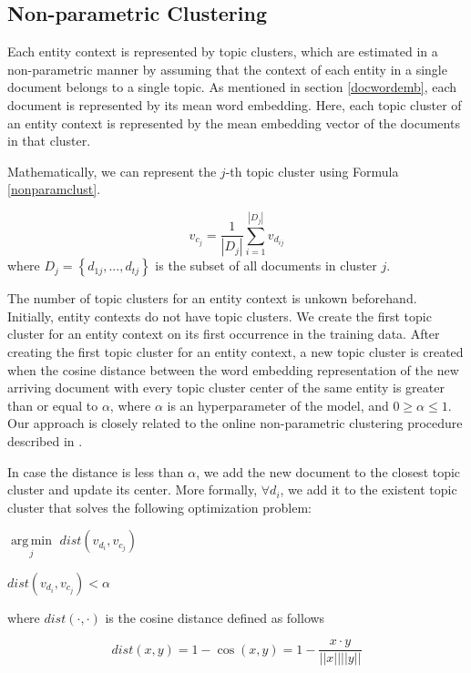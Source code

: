 \documentclass{article}
\DeclareMathOperator*{\argmin}{arg\,min}
\begin{document}
\subsection{Non-parametric Clustering}

Each entity context is represented by topic clusters, which are estimated in a non-parametric manner by assuming that the context of each entity in a single document belongs to a single topic. As mentioned in section \ref{docwordemb}, each document is represented by its mean word embedding. Here, each topic cluster of an entity context is represented by the mean embedding vector of the documents in that cluster.

Mathematically, we can represent the $j$-th topic cluster using Formula \ref{nonparamclust}.

\begin{equation}
\label{nonparamclust}
v_{c_{j}} = \frac{1}{|D_j|} \sum_{i=1}^{|D_j|}{v_{d_{ij}}}
\end{equation}
where $D_j = \left\{ {d_{1j}, ..., d_{tj}} \right\}$ is the subset of all documents in cluster $j$.

The number of topic clusters for an entity context is unkown beforehand. Initially, entity contexts do not have topic clusters. We create the first topic cluster for an entity context on its first occurrence in the training data. After creating the first topic cluster for an entity context, a new topic cluster is created when the cosine distance between the word embedding representation of the new arriving document with every topic cluster center of the same entity is greater than or equal to $\alpha$, where $\alpha$ is an hyperparameter of the model, and $0 \geq \alpha \leq 1$. Our approach is closely related to the online non-parametric clustering procedure described in \citet{Arvind14}.

In case the distance is less than $\alpha$, we add the new document to the closest topic cluster and update its center. More formally, $\forall d_i$, we add it to the existent topic cluster that solves the following optimization problem:\\

\centerline{$\underset{j}{\argmin}$\;\; $dist(v_{d_i}, v_{c_{j}})$} 
\centerline{ $dist(v_{d_i}, v_{c_{j}}) < \alpha$}

where $dist(\cdot,\cdot)$ is the cosine distance defined as follows

\begin{equation}
\label{cosine}
dist(x,y) = 1 - \cos(x,y) = 1 - \frac{x \cdot y}{||x||||y||}
\end{equation}
\end{document}
